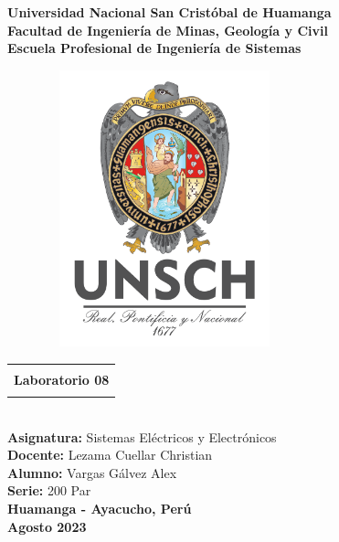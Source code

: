 \begin{titlepage}
	\begin{center}
		{\LARGE\textbf{Universidad Nacional San Cristóbal de Huamanga}}\\
		\vspace{0.5cm}
		{\LARGE\textbf{Facultad de Ingeniería de Minas, Geología y Civil}}\\
		\vspace{0.5cm}
		{\LARGE\textbf{Escuela Profesional de Ingeniería de Sistemas}}\\
		\vspace{1cm}
		\begin{figure}[h]
			\centering
			\includegraphics[width=7cm, height=8cm]{imagenes/logo}
		\end{figure}
		\vspace{0.75cm}
		\begin{tabular}{|c|}
			\hline
			\\
			{\Large\textbf{ Laboratorio 08  }}\\
			\\
			\hline
		\end{tabular}\\
		\vspace{0.75cm}
		{\Large\textbf{Asignatura: }Sistemas Eléctricos y Electrónicos}\\
		\vspace{0.75cm}
		{\Large\textbf{Docente: }Lezama Cuellar Christian}\\
		\vspace{0.75cm}
		{\Large\textbf{Alumno: }Vargas Gálvez Alex}\\
		\vspace{0.75cm}
		{\large\textbf{Serie: }200 Par}\\
		\vspace{ 1.5cm}
		{\huge \textbf{Huamanga - Ayacucho, Perú}}\\
		\vspace{1cm}
		{\huge \textbf{Agosto 2023}}
	\end{center}
\end{titlepage}